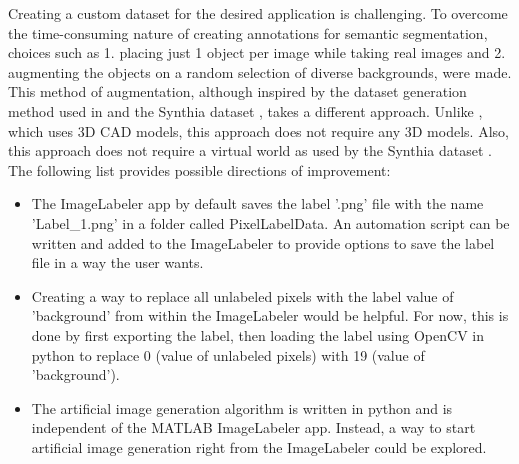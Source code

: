 Creating a custom dataset for the desired application is challenging. To overcome the time-consuming nature of creating annotations for semantic segmentation, choices such as 1. placing just 1 object per image while taking real images and 2. augmenting the objects on a random selection of diverse backgrounds, were made. This method of augmentation, although inspired by the dataset generation method used in \cite{DBLP:journals/corr/abs-1709-00849} and the Synthia dataset \cite{RosCVPR16}, takes a different approach. Unlike \cite{DBLP:journals/corr/abs-1709-00849}, which uses 3D CAD models, this approach does not require any 3D models. Also, this approach does not require a virtual world as used by the Synthia dataset \cite{RosCVPR16}. 
The following list provides possible directions of improvement:
	\begin{itemize}
		\item The ImageLabeler app by default saves the label '.png' file with the name 'Label\_1.png' in a folder called PixelLabelData. An automation script can be written and added to the ImageLabeler to provide options to save the label file in a way the user wants.
		\item Creating a way to replace all unlabeled pixels with the label value of 'background' from within the ImageLabeler would be helpful. For now, this is done by first exporting the label, then loading the label using OpenCV in python to replace 0 (value of unlabeled pixels) with 19 (value of 'background').
		\item The artificial image generation algorithm is written in python and is independent of the MATLAB ImageLabeler app. Instead, a way to start artificial image generation right from the ImageLabeler could be explored.
	\end{itemize}
	